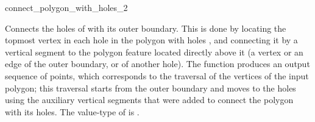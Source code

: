 \begin{ccRefFunction}{connect_polygon_with_holes_2}
\label{ref_bso_connect_holes}

\ccThreeToTwo

\ccDefinition


{Connects the holes of  with its outer boundary. This is done
 by locating the topmost vertex in each hole in the polygon with holes
 , and connecting it by a vertical segment to the polygon
 feature located directly above it (a vertex or an edge of the outer
 boundary, or of another hole). The function produces an output
 sequence of points, which corresponds to the traversal of the vertices
 of the input polygon; this traversal starts from the outer boundary
 and moves to the holes using the auxiliary vertical segments that
 were added to connect the polygon with its holes. The value-type
 of  is .
 }

\end{ccRefFunction}

\ccRefPageEnd
